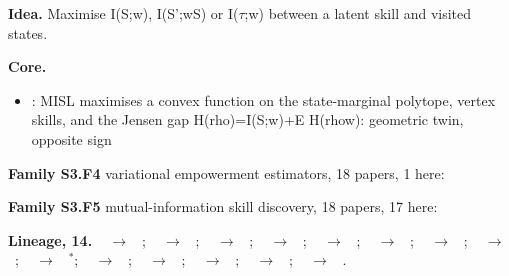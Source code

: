 \documentclass[10pt]{article}
\newcommand{\memb}[1]{\par\smallskip\textbf{#1}\quad}
\begin{document}
\textbf{Idea.} Maximise I(S;w), I(S';w\textbar{}S) or I(\ensuremath{\tau};w) between a latent skill and visited states.

\memb{Core.}
\begin{itemize}[nosep,leftmargin=1.2em]
\item \citet{Eysenbach-information21}: MISL maximises a convex function on the state-marginal polytope, vertex skills, and the Jensen gap H(rho)=I(S;w)+E H(rho\textbar{}w): geometric twin, opposite sign
\end{itemize}
\memb{Family S3.F4} variational empowerment estimators, 18 papers, 1 here: {\footnotesize \citetext{\citealp{Choi-variational21}}}

\memb{Family S3.F5} mutual-information skill discovery, 18 papers, 17 here: {\footnotesize \citetext{\citealp{Eysenbach-information21}; \citealp{Achiam-variational18}; \citealp{Eysenbach-diversity18}; \citealp{Warde-Farley-unsupervised18}; \citealp{Hansen-fast20}; \citealp{Sharma-dynamics19}; \citealp{Campos-explore20}; \citealp{Liu-aps21}; \citealp{Laskin-cic22}; \citealp{Mazzaglia-choreographer22}; \citealp{Park-metra23}; \citealp{Zheng-misl24}; \citealp{Modirshanechi-unifying26}; \citealp{Baumli-relative20}; \citealp{Laskin-urlb21}; \citealp{Park-lipschitz22}; \citealp{Park-controllability23}}}

\memb{Lineage, 14.} {\footnotesize \citeauthor{Gregor-variational16}~\citeyear{Gregor-variational16} $\to$ \citeauthor{Eysenbach-diversity18}~\citeyear{Eysenbach-diversity18}; \citeauthor{Gregor-variational16}~\citeyear{Gregor-variational16} $\to$ \citeauthor{Sharma-dynamics19}~\citeyear{Sharma-dynamics19}; \citeauthor{Gregor-variational16}~\citeyear{Gregor-variational16} $\to$ \citeauthor{Campos-explore20}~\citeyear{Campos-explore20}; \citeauthor{Eysenbach-diversity18}~\citeyear{Eysenbach-diversity18} $\to$ \citeauthor{Sharma-dynamics19}~\citeyear{Sharma-dynamics19}; \citeauthor{Eysenbach-diversity18}~\citeyear{Eysenbach-diversity18} $\to$ \citeauthor{Eysenbach-information21}~\citeyear{Eysenbach-information21}; \citeauthor{Sharma-dynamics19}~\citeyear{Sharma-dynamics19} $\to$ \citeauthor{Campos-explore20}~\citeyear{Campos-explore20}; \citeauthor{Sharma-dynamics19}~\citeyear{Sharma-dynamics19} $\to$ \citeauthor{Laskin-cic22}~\citeyear{Laskin-cic22}; \citeauthor{Campos-explore20}~\citeyear{Campos-explore20} $\to$ \citeauthor{Campos-explore20}~\citeyear{Campos-explore20}; \citeauthor{Eysenbach-information21}~\citeyear{Eysenbach-information21} $\to$ \citeauthor{Park-metra23}~\citeyear{Park-metra23}$^\ast$; \citeauthor{Eysenbach-information21}~\citeyear{Eysenbach-information21} $\to$ \citeauthor{Bastankhah-learning26}~\citeyear{Bastankhah-learning26}; \citeauthor{Park-metra23}~\citeyear{Park-metra23} $\to$ \citeauthor{Park-metra23}~\citeyear{Park-metra23}; \citeauthor{Park-metra23}~\citeyear{Park-metra23} $\to$ \citeauthor{Zheng-misl24}~\citeyear{Zheng-misl24}; \citeauthor{Park-metra23}~\citeyear{Park-metra23} $\to$ \citeauthor{Bastankhah-learning26}~\citeyear{Bastankhah-learning26}; \citeauthor{Bastankhah-learning26}~\citeyear{Bastankhah-learning26} $\to$ \citeauthor{Zheng-misl24}~\citeyear{Zheng-misl24}.}
\end{document}
